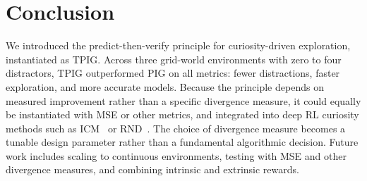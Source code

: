 \documentclass[letterpaper]{article} %
\begin{document}
\section{Conclusion}

We introduced the predict-then-verify principle for curiosity-driven
exploration, instantiated as TPIG.  Across three grid-world
environments with zero to four distractors, TPIG outperformed PIG on
all metrics: fewer distractions, faster exploration, and more accurate
models.  Because
the principle depends on measured improvement rather than a specific
divergence measure, it could equally be instantiated with MSE or other
metrics, and integrated into deep RL curiosity methods such as
ICM~\cite{Pathak2017ICM} or RND~\cite{Burda2019RND}.  The choice of divergence measure becomes a tunable design parameter
rather than a fundamental algorithmic decision.  Future work includes
scaling to continuous environments, testing with MSE and other
divergence measures, and combining intrinsic and extrinsic rewards.



\end{document}
